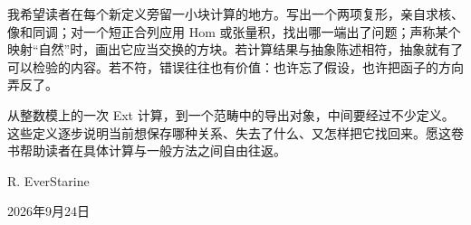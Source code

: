 \ProseParagraphBreak
我希望读者在每个新定义旁留一小块计算的地方。写出一个两项复形，亲自求核、像和同调；对一个短正合列应用 Hom 或张量积，找出哪一端出了问题；声称某个映射“自然”时，画出它应当交换的方块。若计算结果与抽象陈述相符，抽象就有了可以检验的内容。若不符，错误往往也有价值：也许忘了假设，也许把函子的方向弄反了。

\ProseParagraphBreak
从整数模上的一次 Ext 计算，到一个范畴中的导出对象，中间要经过不少定义。这些定义逐步说明当前想保存哪种关系、失去了什么、又怎样把它找回来。愿这卷书帮助读者在具体计算与一般方法之间自由往返。

\bigskip
\begin{flushright}
	R. EverStarine

	2026年9月24日
\end{flushright}
